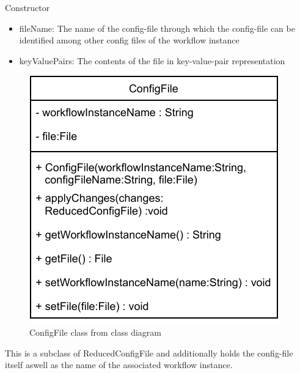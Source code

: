 \begin{methodenv}{Constructor}


\begin{itemize}
	\item{fileName:}
	The name of the config-file through which the config-file can be identified among other config files of the workflow instance
	\item{keyValuePairs:}
	The contents of the file in key-value-pair representation
\end{itemize}
\end{methodenv}



\begin{figure}[h]
\centerline{\includegraphics[scale=1]{res/Klassen/ConfigFile.pdf}}
\caption{ConfigFile class from class diagram}
\end{figure}

This is a subclass of ReducedConfigFile and additionally holds the config-file itself aswell as the name of the associated workflow instance.

